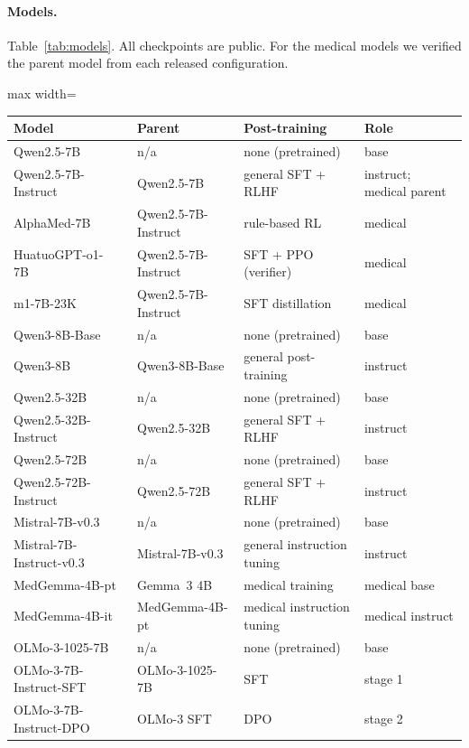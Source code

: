 \documentclass[11pt]{article}
\begin{document}
\paragraph{Models.} Table~\ref{tab:models}. All checkpoints are public. For the medical models we verified the parent model from each released configuration.

\begin{table}[t]
\centering\small
\begin{adjustbox}{max width=\linewidth}
\begin{tabular}{llll}
\toprule
Model & Parent & Post-training & Role \\
\midrule
Qwen2.5-7B & n/a & none (pretrained) & base \\
Qwen2.5-7B-Instruct & Qwen2.5-7B & general SFT + RLHF & instruct; medical parent \\
AlphaMed-7B~\citep{liu2025alphamed} & Qwen2.5-7B-Instruct & rule-based RL & medical \\
HuatuoGPT-o1-7B~\citep{chen2024huatuogpto1} & Qwen2.5-7B-Instruct & SFT + PPO (verifier) & medical \\
m1-7B-23K~\citep{huang2025m1} & Qwen2.5-7B-Instruct & SFT distillation & medical \\
Qwen3-8B-Base & n/a & none (pretrained) & base \\
Qwen3-8B & Qwen3-8B-Base & general post-training & instruct \\
Qwen2.5-32B & n/a & none (pretrained) & base \\
Qwen2.5-32B-Instruct & Qwen2.5-32B & general SFT + RLHF & instruct \\
Qwen2.5-72B & n/a & none (pretrained) & base \\
Qwen2.5-72B-Instruct & Qwen2.5-72B & general SFT + RLHF & instruct \\
\midrule
Mistral-7B-v0.3 & n/a & none (pretrained) & base \\
Mistral-7B-Instruct-v0.3 & Mistral-7B-v0.3 & general instruction tuning & instruct \\
\midrule
MedGemma-4B-pt & Gemma~3 4B & medical training & medical base \\
MedGemma-4B-it & MedGemma-4B-pt & medical instruction tuning & medical instruct \\
\midrule
OLMo-3-1025-7B~\citep{olmo2025olmo3} & n/a & none (pretrained) & base \\
OLMo-3-7B-Instruct-SFT & OLMo-3-1025-7B & SFT & stage 1 \\
OLMo-3-7B-Instruct-DPO & OLMo-3 SFT & DPO & stage 2 \\

\end{tabular}
\end{adjustbox}
\end{table}
\end{document}
